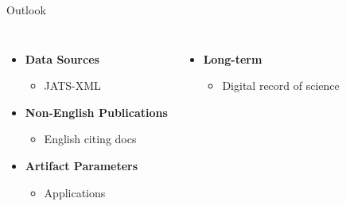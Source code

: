 \documentclass[en,16:9,smallfoot]{sdqbeamer}
\begin{document}
   \begin{frame}[t]{Outlook}
   \begin{columns}
        \begin{itemize}
            \item \textbf{Data Sources}
            \begin{itemize}
                \item JATS-XML
            \end{itemize}
            \item \textbf{Non-English Publications}
            \begin{itemize}
                \item English citing docs
            \end{itemize}
            \item \textbf{Artifact Parameters}
            \begin{itemize}
                \item Applications
            \end{itemize}
        \end{itemize}
        \vspace{1.5em}
        \begin{itemize}
            \item \textbf{Long-term}
            \begin{itemize}
                \item Digital record of science
            \end{itemize}
        \end{itemize}


\end{columns}
\end{frame}
\end{document}
